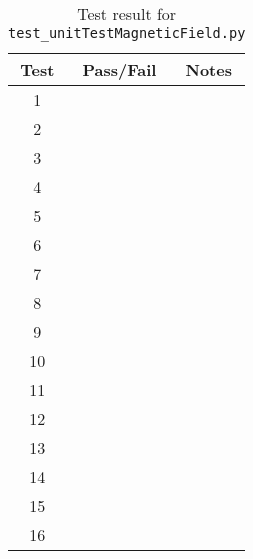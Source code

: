 \begin{table}[H]
	\caption{Test result for {\tt test\_unitTestMagneticField.py}}
	\label{tab:results}
	\centering \fontsize{10}{10}\selectfont
	\begin{tabular}{c | c | c } %
	\hline
	\textbf{Test} & \textbf{Pass/Fail} & \textbf{Notes} \\ \hline
	1      &  \\ \hline
	2      &  \\ \hline
	3      &  \\ \hline
	4      &  \\ \hline
	5      &  \\ \hline
	6      &  \\ \hline
	7      &  \\ \hline
	8      &  \\ \hline
	9      &  \\ \hline
	10      &  \\ \hline
	11      &  \\ \hline
	12      &  \\ \hline
	13      &  \\ \hline
	14      &  \\ \hline
	15      &  \\ \hline
	16      &  \\ \hline

	\end{tabular}
\end{table}



